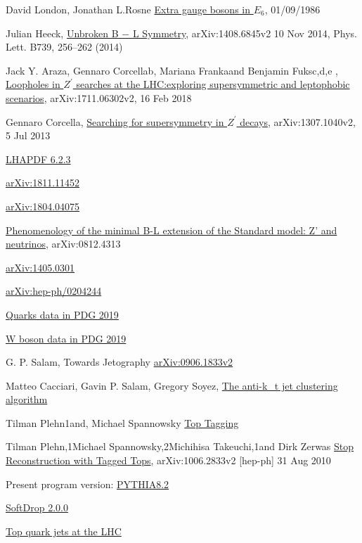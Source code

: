 \documentclass[12pt,a4paper]{article}		%
\begin{document}
\begin{thebibliography}{}
	 David London, Jonathan L.Rosne \href{https://journals.aps.org/prd/pdf/10.1103/PhysRevD.34.1530}{Extra gauge bosons in $E_6$}, 01/09/1986
	
	 Julian Heeck, \href{https://arxiv.org/pdf/1408.6845.pdf}{Unbroken B − L Symmetry}, arXiv:1408.6845v2 10 Nov 2014, Phys. Lett. B739, 256–262 (2014) 
	
	 Jack Y. Araza, Gennaro Corcellab, Mariana Frankaand Benjamin Fuksc,d,e , \href{https://arxiv.org/pdf/1711.06302.pdf}{Loopholes in $Z^\prime$ searches at the LHC:exploring supersymmetric and leptophobic scenarios}, arXiv:1711.06302v2, 16 Feb 2018 
	
	 Gennaro Corcella, \href{https://arxiv.org/pdf/1307.1040.pdf}{Searching for supersymmetry in $Z^\prime$ decays}, arXiv:1307.1040v2, 5 Jul 2013
	
	 \href{https://lhapdf.hepforge.org/pdfsets}{LHAPDF 6.2.3}
	
	 \href{https://arxiv.org/abs/1811.11452}{arXiv:1811.11452}
	
	 \href{https://arxiv.org/abs/1804.04075}{arXiv:1804.04075}
	
	 \href{https://arxiv.org/abs/0812.4313}{Phenomenology of the minimal B-L extension of the Standard model: Z' and neutrinos}, arXiv:0812.4313
	
	 \href{https://arxiv.org/abs/1405.0301}{arXiv:1405.0301}
	
	\href{https://arxiv.org/abs/hep-ph/0204244}{arXiv:hep-ph/0204244}
	
	 \href{http://pdg.lbl.gov/2019/tables/rpp2019-sum-quarks.pdf}{Quarks data in PDG 2019}
	
	 \href{http://pdg.lbl.gov/2019/listings/rpp2019-list-w-boson.pdf}{W boson data in PDG 2019}
	
	 G. P. Salam, Towards Jetography \href{https://arxiv.org/abs/0906.1833}{arXiv:0906.1833v2}
	
	 Matteo Cacciari, Gavin P. Salam, Gregory Soyez, \href{https://arxiv.org/abs/0802.1189}{The anti-k_t jet clustering algorithm} 
	
	 Tilman  Plehn1and, Michael Spannowsky \href{https://arxiv.org/pdf/1112.4441.pdf}{Top Tagging}
	
	 Tilman Plehn,1Michael Spannowsky,2Michihisa Takeuchi,1and Dirk Zerwas \href{https://arxiv.org/pdf/1006.2833.pdf}{Stop Reconstruction with Tagged Tops}, arXiv:1006.2833v2 [hep-ph] 31 Aug 2010
	
	 Present program version: \href{http://home.thep.lu.se/~torbjorn/Pythia.html}{PYTHIA8.2}
	
	 \href{https://phab.hepforge.org/source/fastjetsvn/browse/contrib/contribs/RecursiveTools/tags/2.0.0-beta2/}{SoftDrop 2.0.0 }
	
	 \href{https://journals.aps.org/prd/pdf/10.1103/PhysRevD.79.074012}{Top quark jets at the LHC}
\end{thebibliography} 
\end{document}

